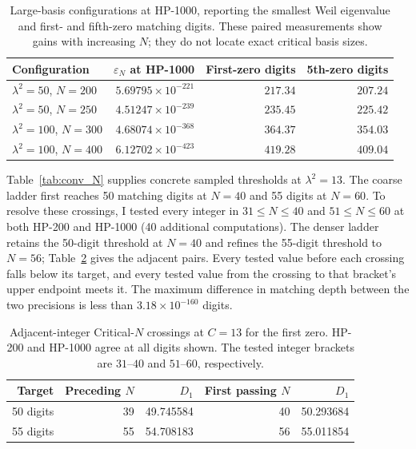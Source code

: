 \documentclass[11pt,a4paper]{article}
\begin{document}
\begin{table}[!htbp]
\centering
\caption{Large-basis configurations at HP-1000, reporting the smallest
Weil eigenvalue and first- and fifth-zero matching digits. These paired
measurements show gains with increasing $N$; they do not locate exact
critical basis sizes.}
\label{tab:critical_N}
\begin{tabular}{@{}lrrr@{}}
\toprule
Configuration & $\varepsilon_N$ at HP-1000 & First-zero digits & 5th-zero digits \\
\midrule
$\lambda^2{=}50$, $N{=}200$  & $5.69795\times 10^{-221}$ & $217.34$ & $207.24$ \\
$\lambda^2{=}50$, $N{=}250$  & $4.51247\times 10^{-239}$ & $235.45$ & $225.42$ \\
$\lambda^2{=}100$, $N{=}300$ & $4.68074\times 10^{-368}$ & $364.37$ & $354.03$ \\
$\lambda^2{=}100$, $N{=}400$ & $6.12702\times 10^{-423}$ & $419.28$ & $409.04$ \\
\bottomrule
\end{tabular}
\end{table}

Table~\ref{tab:conv_N} supplies concrete sampled thresholds at
$\lambda^2=13$. The coarse ladder first reaches 50 matching digits at
$N=40$ and 55 digits at $N=60$. To resolve these crossings, I tested
every integer in $31\leq N\leq40$ and $51\leq N\leq60$ at both
HP-200 and HP-1000 (40 additional computations). The denser ladder
retains the 50-digit threshold at $N=40$ and refines the 55-digit
threshold to $N=56$; Table~\ref{tab:critical_brackets} gives the
adjacent pairs. Every tested value before each crossing falls below
its target, and every tested value from the crossing to that bracket's
upper endpoint meets it. The maximum difference in matching depth
between the two precisions is less than $3.18\times10^{-160}$ digits.

\begin{table}[!htbp]
\centering
\caption{Adjacent-integer Critical-$N$ crossings at $C=13$ for the
first zero. HP-200 and HP-1000 agree at all digits shown. The tested
integer brackets are $31$--$40$ and $51$--$60$, respectively.}
\label{tab:critical_brackets}
\begin{tabular}{@{}rrrrr@{}}
\toprule
Target & Preceding $N$ & $D_1$ & First passing $N$ & $D_1$ \\
\midrule
50 digits & 39 & 49.745584 & 40 & 50.293684 \\
55 digits & 55 & 54.708183 & 56 & 55.011854 \\
\bottomrule
\end{tabular}
\end{table}
\end{document}
